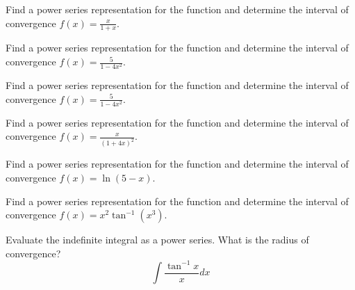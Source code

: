 \documentclass[
  course = {{MATH102 Calculus II}},
  quartile = {{2}},
  assignment = {{Sections 11.9}},%
  topic = {{Represenation of functions as Power Series}},
  firstexercise = 1,
  term = 203
]{../class/aga-homework}
\begin{document}
\newpage

\problem Find a power series representation for the function and determine the interval of convergence $\displaystyle f(x)=\frac{x}{1+x}$.

\newpage

\problem Find a power series representation for the function and determine the interval of convergence $\displaystyle f(x)=\frac{5}{1-4x^2}$.

\newpage

\problem Find a power series representation for the function and determine the interval of convergence $\displaystyle f(x)=\frac{5}{1-4x^2}$.

\newpage

\problem Find a power series representation for the function and determine the interval of convergence $\displaystyle f(x)=\frac{x}{(1+4x)^2}$.

\newpage

\problem Find a power series representation for the function and determine the interval of convergence $\displaystyle f(x)=\ln(5-x)$.

\newpage

\problem Find a power series representation for the function and determine the interval of convergence $\displaystyle f(x)=x^2\tan^{-1}(x^3)$.

\newpage

\problem Evaluate the indefinite integral as a power series. What is the radius of convergence?
\[
\displaystyle
\int \frac{\tan^{-1}x}{x} dx
\]

\newpage
\afterpage{\null\newpage}

\afterpage{\null\newpage}

\afterpage{\null\newpage}
\end{document}

